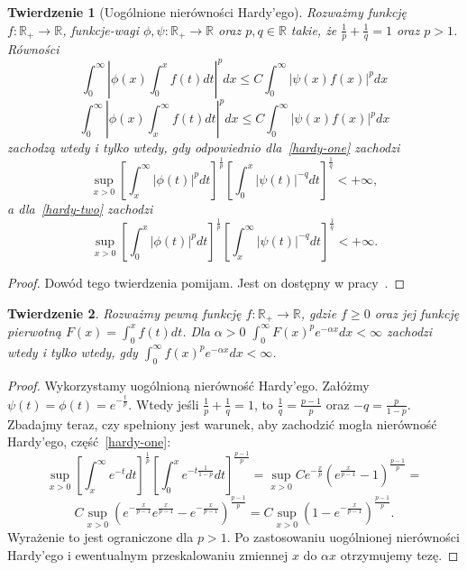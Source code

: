 \documentclass[licencjacka]{pracamgr}
\theoremstyle{definition}
\theoremstyle{definition}
\theoremstyle{plain}
\theoremstyle{plain}
\theoremstyle{plain}
\newtheorem{theorem}{Twierdzenie}[section]
\theoremstyle{plain}
\begin{document}
\begin{theorem}[Uogólnione nierówności Hardy'ego]\label{hardy}
    Rozważmy funkcję $f: \mathbb{R}_{+} \rightarrow \mathbb{R}$, funkcje-wagi
    $\phi, \psi: \mathbb{R}_{+} \rightarrow \mathbb{R}$ oraz $p, q \in
    \mathbb{R}$ takie, że $\frac{1}{p} + \frac{1}{q} = 1 $ oraz $p > 1$.  Równości 
\begin{equation}\label{hardy-one}
\int_0^\infty \left|
                \phi(x) \int_0^x f(t) dt
              \right|^p dx
\leq
C \int_0^\infty \left|
                    \psi(x)  f(x)
                \right|^p dx
\end{equation}
\begin{equation}\label{hardy-two}
\int_0^\infty \left|
                \phi(x) \int_x^\infty f(t) dt
              \right|^p dx
\leq
C \int_0^\infty \left|
                    \psi(x)  f(x)
                \right|^p dx
\end{equation}
zachodzą wtedy i tylko wtedy, gdy odpowiednio dla~\ref{hardy-one} zachodzi
\[
\sup_{x > 0}
\left[
\int_x^\infty  
   | \phi(t) |^p dt
\right]^{\frac{1}{p}}
\left[
\int_0^x
    | \psi(t) |^{-q} dt
\right]^{\frac{1}{q}} < + \infty,
\]
a dla~\ref{hardy-two} zachodzi
\[
\sup_{x > 0}
\left[
\int_0^x
   | \phi(t) |^p dt
\right]^{\frac{1}{p}}
\left[
\int_x^\infty
    | \psi(t) |^{-q} dt
\right]^{\frac{1}{q}} < + \infty.
\]

\end{theorem}
\begin{proof}
Dowód tego twierdzenia pomijam. Jest on dostępny w pracy~\cite{hardys}.
\end{proof}

\begin{theorem}
Rozważmy pewną funkcję $f: \mathbb{R}_{+} \rightarrow \mathbb{R}$, gdzie $f
\geq 0$ oraz jej funkcję pierwotną $F(x) = \int_0^{x} f(t) dt$. Dla $\alpha > 0$ 
 $\int_0^\infty F(x)^pe^{- \alpha x}dx < \infty$
zachodzi wtedy i tylko wtedy, gdy
$\int_0^\infty f(x)^p e^{-\alpha x}dx < \infty$.
\end{theorem}
\begin{proof}
Wykorzystamy uogólnioną nierówność Hardy'ego.  Załóżmy $\psi(t) = \phi(t) =
e^{- \frac{t}{p} }$. Wtedy jeśli $\frac{1}{p} + \frac{1}{q} = 1 $, to
$\frac{1}{q} = \frac{p-1}{p}$ oraz $-q = \frac{p}{1-p}$.  Zbadajmy teraz, czy
spełniony jest warunek, aby zachodzić mogła nierówność Hardy'ego, część~\ref{hardy-one}:
$$
\sup_{x > 0}
\left[
\int_x^\infty  
    e^{-t} dt
\right]^{\frac{1}{p}}
\left[
\int_0^x
    e^{-t \frac{1}{1-p}} dt
\right]^{\frac{p-1}{p}}
=
\sup_{x > 0}
    C
    e^{- \frac{x}{p}}
    \left(
        e^{\frac{x}{p-1}} - 1
    \right)^{\frac{p-1}{p}}
=
$$
$$
C
\sup_{x > 0}
    \left(
    e^{- \frac{x}{p-1}}
        e^{\frac{x}{p-1}} -
    e^{- \frac{x}{p-1}}
    \right)^{\frac{p-1}{p}}
=
C
\sup_{x > 0}
    \left(
        1 -
    e^{- \frac{x}{p-1}}
    \right)^{\frac{p-1}{p}}. 
$$
Wyrażenie to jest ograniczone dla $p> 1$. Po zastosowaniu uogólnionej
nierówności Hardy'ego i ewentualnym przeskalowaniu zmiennej $x$ do $\alpha x$
otrzymujemy tezę.
\end{proof}
\end{document}
